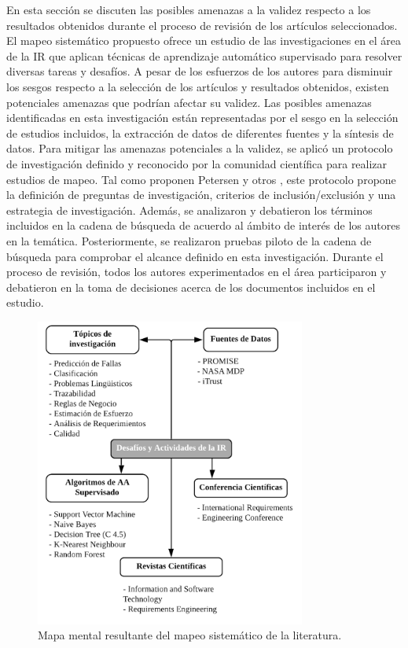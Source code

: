 \documentclass[journal]{IEEEtran}
\begin{document}
En esta sección se discuten las posibles amenazas a la validez respecto a los resultados obtenidos durante el proceso de revisión de los artículos seleccionados. El mapeo sistemático propuesto ofrece un estudio de las investigaciones en el área de la IR que aplican técnicas de aprendizaje automático supervisado para resolver diversas tareas y desafíos. A pesar de los esfuerzos de los autores para disminuir los sesgos respecto a la selección de los artículos y resultados obtenidos, existen potenciales amenazas que podrían afectar su validez. Las posibles amenazas identificadas en esta investigación están representadas por el sesgo en la selección de estudios incluidos, la extracción de datos de diferentes fuentes y la síntesis de datos. Para mitigar las amenazas potenciales a la validez, se aplicó un protocolo de investigación definido y reconocido por la comunidad científica para realizar estudios de mapeo. Tal como proponen Petersen y otros \cite{petersen2008systematic}, este protocolo propone la definición de preguntas de investigación, criterios de inclusión/exclusión y una estrategia de investigación. Además, se analizaron y debatieron los términos incluidos en la cadena de búsqueda de acuerdo al ámbito de interés de los autores en la temática. Posteriormente, se realizaron pruebas piloto de la cadena de búsqueda para comprobar el alcance definido en esta investigación. Durante el proceso de revisión, todos los autores experimentados en el área participaron y debatieron en  la toma de decisiones acerca de los documentos incluidos en el estudio.


\begin{figure}[!t]
\centering
\includegraphics[width=3.5in]{figures/figure12_Guada.png}
\caption{Mapa mental resultante del mapeo sistemático de la literatura.}
\label{fig12}
\end{figure}
\end{document}

